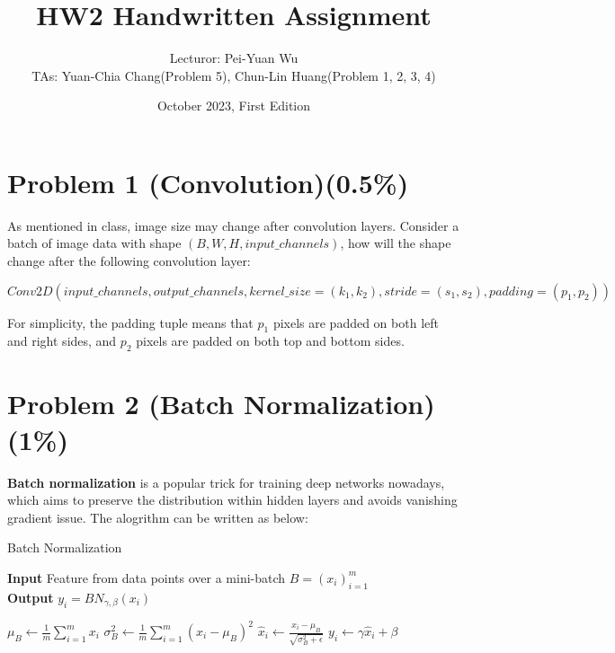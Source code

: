 \documentclass{article}
\title{HW2 Handwritten Assignment}
\author{Lecturor: Pei-Yuan Wu\\
TAs: {Yuan-Chia Chang(Problem 5), Chun-Lin Huang(Problem 1, 2, 3, 4)}}
\date{October 2023, First Edition}
\begin{document}
\maketitle

\section*{Problem 1 (Convolution)(0.5\%)}
As mentioned in class, image size may change after convolution layers. Consider a batch of image data with shape $(B, W, H, input\_channels)$, how will the shape change after the following convolution layer:
\begin{footnotesize}
\begin{equation*}
Conv2D \left( input\_channels, output\_channels, kernel\_size=(k_1,k_2), stride=(s_1,s_2), padding=(p_1,p_2) \right)
\end{equation*}
\end{footnotesize}
%
For simplicity, the padding tuple means that $p_1$ pixels are padded on both left and right sides, and $p_2$ pixels are padded on both top and bottom sides.

\section*{Problem 2 (Batch Normalization)(1\%)}
{\bf Batch normalization}\cite{Ioffe2015} is a popular trick for training deep networks nowadays, which aims to preserve the distribution within hidden layers and avoids vanishing gradient issue.  The alogrithm can be written as below:
\begin{algorithm}
  \caption{Batch Normalization}
  \label{alg:batch_normalization}
  \hspace*{\algorithmicindent} \textbf{Input} Feature from data points over a mini-batch $B = (x_i)_{i=1}^m$\\
  \hspace*{\algorithmicindent} \textbf{Output} $y_i = {BN}_{\gamma,\beta}(x_i)$
  \begin{algorithmic}[1]
    \State $\mu_B \gets \frac{1}{m}\sum_{i=1}^m x_i$ 					
    \State $\sigma^2_B \gets \frac{1}{m}\sum_{i=1}^m (x_i-\mu_B)^2$ 		
      \State ${\hat x}_i \gets \frac{x_i-\mu_B}{\sqrt{\sigma_{B}^{2}+\epsilon}}$ 	
      \State $y_i \gets \gamma {\hat x}_i + \beta$ 							
    \EndFor
    \State \Return 
    \EndProcedure
   \end{algorithmic}
\end{algorithm}
%
\end{document}
